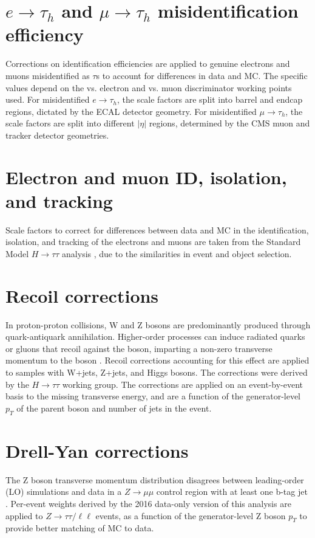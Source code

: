 \section{$e \rightarrow \tau_{h}$ and $\mu \rightarrow \tau_{h}$ misidentification efficiency}
Corrections on identification efficiencies are applied to genuine electrons and muons misidentified as $\tau$s to account for differences in data and MC. The specific values depend on the vs. electron and vs. muon discriminator working points used. For misidentified $e \rightarrow \tau_{h}$, the scale factors are split into barrel and endcap regions, dictated by the ECAL detector geometry. For misidentified $\mu \rightarrow \tau_{h}$, the scale factors are split into different $|\eta|$ regions, determined by the CMS muon and tracker detector geometries.


\section{Electron and muon ID, isolation, and tracking}
Scale factors to correct for differences between data and MC in the identification, isolation, and tracking of the electrons and muons are taken from the Standard Model $H \rightarrow \tau\tau$ analysis \cite{CMS-HIG-16-043}, due to the similarities in event and object selection.

\section{Recoil corrections}
In proton-proton collisions, W and Z bosons are predominantly produced through quark-antiquark annihilation. Higher-order processes can induce radiated quarks or gluons that recoil against the boson, imparting a non-zero transverse momentum to the boson \cite{2009-Tevatron-recoil-correction}. Recoil corrections accounting for this effect are applied to samples with W+jets, Z+jets, and Higgs bosons. The corrections were derived by the $H \rightarrow \tau\tau$ working group. The corrections are applied on an event-by-event basis to the missing transverse energy, and are a function of the generator-level $p_{T}$ of the parent boson and number of jets in the event.

\section{Drell-Yan corrections}
The Z boson transverse momentum distribution disagrees between leading-order (LO) simulations and data in a $Z \rightarrow \mu\mu$ control region with at least one b-tag jet \cite{CMS-HIG-17-024}. Per-event weights derived by the 2016 data-only version of this analysis \cite{CMS-HIG-17-024} are applied to $Z \rightarrow \tau\tau / \ell \ell$ events, as a function of the generator-level Z boson $p_{T}$ to provide better matching of MC to data.


